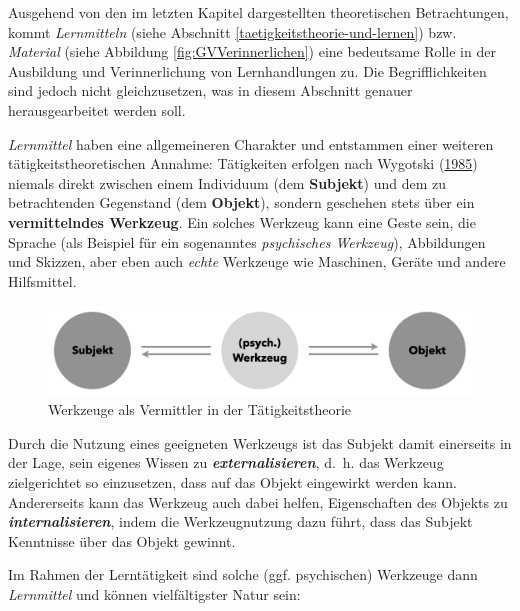 \documentclass[
]{scrbook}
\theoremstyle{definition}
\theoremstyle{definition}
\theoremstyle{definition}
\theoremstyle{definition}
\theoremstyle{remark}
\begin{document}
Ausgehend von den im letzten Kapitel dargestellten theoretischen Betrachtungen, kommt \emph{Lernmitteln} (siehe Abschnitt \ref{taetigkeitstheorie-und-lernen}) bzw. \emph{Material} (siehe Abbildung \ref{fig:GVVerinnerlichen}) eine bedeutsame Rolle in der Ausbildung und Verinnerlichung von Lernhandlungen zu. Die Begrifflichkeiten sind jedoch nicht gleichzusetzen, was in diesem Abschnitt genauer herausgearbeitet werden soll.

\emph{Lernmittel} haben eine allgemeineren Charakter und entstammen einer weiteren tätigkeitstheoretischen Annahme: Tätigkeiten erfolgen nach Wygotski (\protect\hyperlink{ref-Wygotski1985a}{1985}) niemals direkt zwischen einem Individuum (dem \textbf{Subjekt}) und dem zu betrachtenden Gegenstand (dem \textbf{Objekt}), sondern geschehen stets über ein \textbf{vermittelndes Werkzeug}. Ein solches Werkzeug kann eine Geste sein, die Sprache (als Beispiel für ein sogenanntes \emph{psychisches Werkzeug}), Abbildungen und Skizzen, aber eben auch \emph{echte} Werkzeuge wie Maschinen, Geräte und andere Hilfsmittel.

\begin{figure}

{\centering \includegraphics[width=0.75\linewidth]{pictures/7-SubjektObjekt} 

}

\caption{Werkzeuge als Vermittler in der Tätigkeitstheorie}\label{fig:SubjektObjekt}
\end{figure}

Durch die Nutzung eines geeigneten Werkzeugs ist das Subjekt damit einerseits in der Lage, sein eigenes Wissen zu \textbf{\emph{externalisieren}}, d.~h. das Werkzeug zielgerichtet so einzusetzen, dass auf das Objekt eingewirkt werden kann. Andererseits kann das Werkzeug auch dabei helfen, Eigenschaften des Objekts zu \textbf{\emph{internalisieren}}, indem die Werkzeugnutzung dazu führt, dass das Subjekt Kenntnisse über das Objekt gewinnt.

Im Rahmen der Lerntätigkeit sind solche (ggf. psychischen) Werkzeuge dann \emph{Lernmittel} und können vielfältigster Natur sein:
\end{document}
